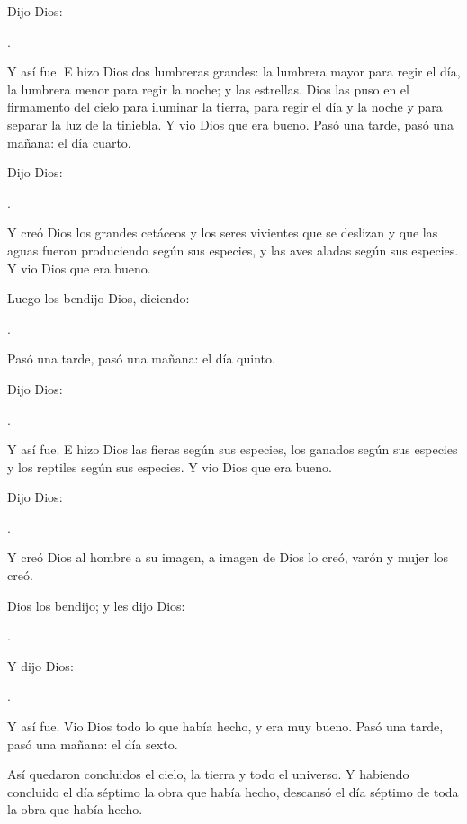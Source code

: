 \begin{scripture}
Dijo Dios: 

.

Y así fue. E hizo Dios dos lumbreras grandes: la lumbrera mayor para regir el día, la lumbrera menor para regir la noche; y las estrellas. Dios las puso en el firmamento del cielo para iluminar la tierra, para regir el día y la noche y para separar la luz de la tiniebla. Y vio Dios que era bueno. Pasó una tarde, pasó una mañana: el día cuarto. 

Dijo Dios: 

.

Y creó Dios los grandes cetáceos y los seres vivientes que se deslizan y que las aguas fueron produciendo según sus especies, y las aves aladas según sus especies. Y vio Dios que era bueno. 

Luego los bendijo Dios, diciendo: 

.

Pasó una tarde, pasó una mañana: el día quinto. 

Dijo Dios: 

.

Y así fue. E hizo Dios las fieras según sus especies, los ganados según sus especies y los reptiles según sus especies. Y vio Dios que era bueno. 

Dijo Dios: 

.

Y creó Dios al hombre a su imagen, a imagen de Dios lo creó, varón y mujer los creó. 

Dios los bendijo; y les dijo Dios: 

.

Y dijo Dios: 

.

Y así fue. Vio Dios todo lo que había hecho, y era muy bueno. Pasó una tarde, pasó una mañana: el día sexto. 

Así quedaron concluidos el cielo, la tierra y todo el universo. Y habiendo concluido el día séptimo la obra que había hecho, descansó el día séptimo de toda la obra que había hecho.
\end{scripture}

